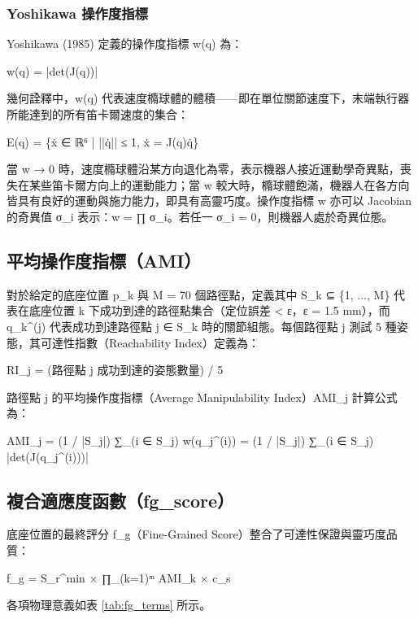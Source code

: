 \documentclass[a4paper, 12pt]{article}
\begin{document}
\subsubsection{Yoshikawa 操作度指標}

Yoshikawa (1985) 定義的操作度指標 w(q) 為：
\begin{center}
w(q) = |det(J(q))|
\end{center}
幾何詮釋中，w(q) 代表速度橢球體的體積——即在單位關節速度下，末端執行器所能達到的所有笛卡爾速度的集合：
\begin{center}
E(q) = \{ẋ ∈ ℝ⁶ | ||q̇|| ≤ 1, ẋ = J(q)q̇\}
\end{center}
當 w → 0 時，速度橢球體沿某方向退化為零，表示機器人接近運動學奇異點，喪失在某些笛卡爾方向上的運動能力；當 w 較大時，橢球體飽滿，機器人在各方向皆具有良好的運動與施力能力，即具有高靈巧度。操作度指標 w 亦可以 Jacobian 的奇異值 σ\_i 表示：w = ∏ σ\_i。若任一 σ\_i = 0，則機器人處於奇異位態。

\subsection{平均操作度指標（AMI）}
\label{subsec:ami}

對於給定的底座位置 p\_k 與 M = 70 個路徑點，定義其中 S\_k ⊆ \{1, ..., M\} 代表在底座位置 k 下成功到達的路徑點集合（定位誤差 < ε，ε = 1.5 mm），而 q\_k\^{}(j) 代表成功到達路徑點 j ∈ S\_k 時的關節組態。每個路徑點 j 測試 5 種姿態，其可達性指數（Reachability Index）定義為：
\begin{center}
RI\_j = (路徑點 j 成功到達的姿態數量) / 5
\end{center}
路徑點 j 的平均操作度指標（Average Manipulability Index）AMI\_j 計算公式為：
\begin{center}
AMI\_j = (1 / |S\_j|) ∑\_(i ∈ S\_j) w(q\_j\^{}(i)) = (1 / |S\_j|) ∑\_(i ∈ S\_j) |det(J(q\_j\^{}(i)))|
\end{center}

\subsection{複合適應度函數（fg\_score）}
\label{subsec:fgscore}

底座位置的最終評分 f\_g（Fine-Grained Score）整合了可達性保證與靈巧度品質：
\begin{center}
f\_g = S\_r\^{}min × ∏\_(k=1)ᵐ AMI\_k × c\_s
\end{center}
各項物理意義如表 \ref{tab:fg_terms} 所示。
\end{document}
